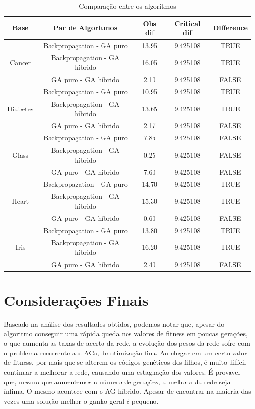 \documentclass[12pt]{article}
\begin{document}
\begin{table}
\center
\begin{tabular}{|c|c|c|c|c|}
\hline Base & Par de Algoritmos            &  Obs dif &  Critical dif &  Difference \\
\hline \multirow{3}{*}{Cancer} & Backpropagation - GA puro & 13.95   &  9.425108 &  TRUE \\
& Backpropagation - GA híbrido &  16.05   &  9.425108     & TRUE       \\
& GA puro - GA híbrido         &   2.10   &  9.425108     & FALSE      \\
\hline \multirow{3}{*}{Diabetes} & Backpropagation - GA puro &  10.95 & 9.425108 &  TRUE \\
& Backpropagation - GA híbrido &  13.65   &  9.425108     &  TRUE       \\
& GA puro - GA híbrido         &   2.17   &  9.425108     &  FALSE      \\
\hline \multirow{3}{*}{Glass} &  Backpropagation - GA puro   &   7.85   &  9.425108 &  FALSE  \\
& Backpropagation - GA híbrido &   0.25   &  9.425108     &  FALSE      \\
& GA puro - GA híbrido         &   7.60   &  9.425108     &  FALSE      \\
\hline \multirow{3}{*}{Heart} & Backpropagation - GA puro    &  14.70   &  9.425108 &  TRUE  \\
& Backpropagation - GA híbrido &  15.30   &  9.425108     &  TRUE       \\
& GA puro - GA híbrido         &   0.60   &  9.425108     &  FALSE      \\
\hline \multirow{3}{*}{Iris} & Backpropagation - GA puro  &  13.80   &  9.425108  &  TRUE  \\
& Backpropagation - GA híbrido &  16.20   &  9.425108     &  TRUE       \\
& GA puro - GA híbrido         &   2.40   &  9.425108     &  FALSE      \\
\hline
\end{tabular}
\caption{Comparação entre os algoritmos}
\label{tab:kwcomp}
\end{table}

\FloatBarrier
\section{Considerações Finais}

Baseado na análise dos resultados obtidos, podemos notar que, apesar do algoritmo conseguir uma rápida queda nos valores de fitness em poucas gerações, o que aumenta as taxas de acerto da rede, a evolução dos pesos da rede sofre com o problema recorrente aos AGs, de otimização fina. Ao chegar em um certo valor de fitness, por mais que se alterem os códigos genéticos dos filhos, é muito difícil continuar a melhorar a rede, causando uma estagnação dos valores. É provavel que, mesmo que aumentemos o número de gerações, a melhora da rede seja ínfima. O mesmo acontece com o AG híbrido. Apesar de encontrar na maioria das vezes uma solução melhor o ganho geral é pequeno.
\end{document}
